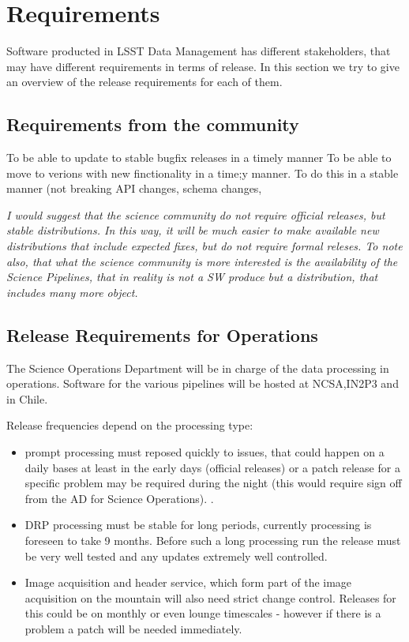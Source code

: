 \section{Requirements} \label{sec:reqs}

Software producted in LSST Data Management has different stakeholders, that may have different requirements in terms of release.
In this section we try to give an overview of the release requirements for each of them.


\subsection{Requirements from the community } \label{sec:comreqs}

To be able to update to stable bugfix releases in a timely manner
To be able to move to verions with new finctionality in a time;y manner.
To do this in a stable manner (not breaking API changes, schema changes,

\textit{ I would suggest that the science community do not require official releases, but stable distributions.
In this way, it will be much easier to make available new distributions that include expected fixes,
but do not require formal releses.
To note also, that what the science community is more interested is the availability of the Science Pipelines,
that in reality is not a SW produce but a distribution, that includes many more object.  }

\subsection{Release Requirements for Operations} \label{sec:procreqs}

The Science Operations Department will be  in charge  of the data processing in operations. Software for the various pipelines
will be hosted at NCSA,IN2P3 and in Chile.

Release frequencies depend on the processing type:

\begin{itemize}
\item prompt processing must reposed quickly to issues, that could happen on a daily bases at least in the early days (official releases)
 or a  patch release  for a specific problem may be required during the night (this would require sign off from the AD for Science Operations).  .
\item DRP processing  must be stable for long periods, currently processing is foreseen to take 9 months.  Before such a long processing run the release must be very well tested and any updates extremely well controlled.
\item Image acquisition and header service, which form part of the image acquisition on the mountain will also need strict change control. Releases for this could be on monthly or even lounge timescales - however if there is a problem a patch will be needed immediately.
\end{itemize}

